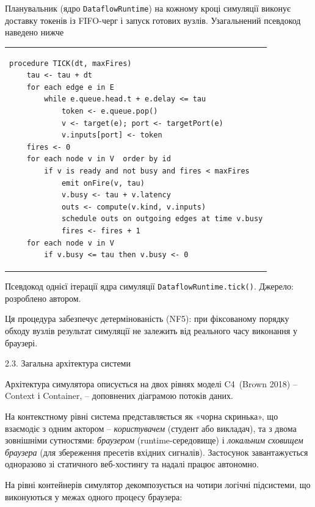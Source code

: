 \documentclass[
]{article}
\newcounter{none} %
\begin{document}
Планувальник (ядро \texttt{DataflowRuntime}) на кожному кроці симуляції
виконує доставку токенів із FIFO-черг і запуск готових вузлів.
Узагальнений псевдокод наведено нижче

{\def\LTcaptype{none} %
\begin{longtable}[]{@{}
  >{\raggedright\arraybackslash}p{}@{}}
\toprule\noalign{}
\endhead
\bottomrule\noalign{}
\endlastfoot
\begin{minipage}[t]{\linewidth}\raggedright
\begin{verbatim}
procedure TICK(dt, maxFires)
    tau <- tau + dt
    for each edge e in E
        while e.queue.head.t + e.delay <= tau
            token <- e.queue.pop()
            v <- target(e); port <- targetPort(e)
            v.inputs[port] <- token
    fires <- 0
    for each node v in V  order by id
        if v is ready and not busy and fires < maxFires
            emit onFire(v, tau)
            v.busy <- tau + v.latency
            outs <- compute(v.kind, v.inputs)
            schedule outs on outgoing edges at time v.busy
            fires <- fires + 1
    for each node v in V
        if v.busy <= tau then v.busy <- 0
\end{verbatim}
\end{minipage} \\
\end{longtable}
}

Псевдокод однієї ітерації ядра симуляції
\texttt{DataflowRuntime.tick}\texttt{()}. Джерело: розроблено автором.

Ця процедура забезпечує детермінованість (NF5): при фіксованому порядку
обходу вузлів результат симуляції не залежить від реального часу
виконання у браузері.

\protect{}\label{_Toc228121457}{}2.3. Загальна архітектура
системи

Архітектура симулятора описується на двох рівнях моделі C4~(Brown 2018)
-- Context і Container, -- доповнених діаграмою потоків даних.

На контекстному рівні система представляється як «чорна скринька», що
взаємодіє з одним актором -- \emph{користувачем} (студент або викладач),
та з двома зовнішніми сутностями: \emph{браузером} (runtime-середовище)
і \emph{локальним сховищем браузера} (для збереження пресетів вхідних
сигналів). Застосунок завантажується одноразово зі статичного
веб-хостингу та надалі працює автономно.

На рівні контейнерів симулятор декомпозується на чотири логічні
підсистеми, що виконуються у межах одного процесу браузера:
\end{document}
